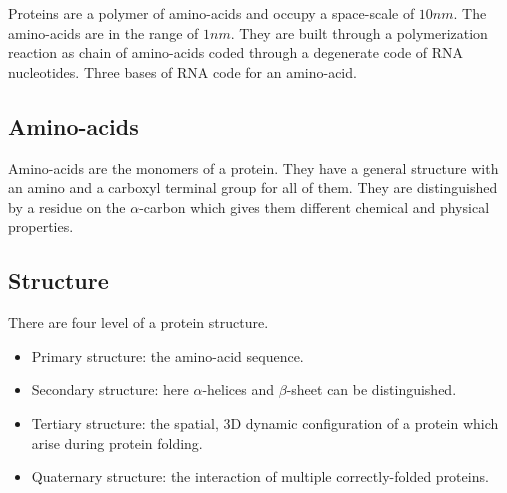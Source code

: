 Proteins are a polymer of amino-acids and occupy a space-scale of $10nm$.
The amino-acids are in the range of $1nm$.
They are built through a polymerization reaction as chain of amino-acids coded through a degenerate code of RNA nucleotides.
Three bases of RNA code for an amino-acid.

	\subsection{Amino-acids}
	Amino-acids are the monomers of a protein.
	They have a general structure with an amino and a carboxyl terminal group for all of them.
	They are distinguished by a residue on the $\alpha$-carbon which gives them different chemical and physical properties.

	\subsection{Structure}
	There are four level of a protein structure.

	\begin{multicols}{2}
		\begin{itemize}
			\item Primary structure: the amino-acid sequence.
			\item Secondary structure: here $\alpha$-helices and $\beta$-sheet can be distinguished.
			\item Tertiary structure: the spatial, 3D dynamic configuration of a protein which arise during protein folding.
			\item Quaternary structure: the interaction of multiple correctly-folded proteins.
		\end{itemize}
	\end{multicols}
